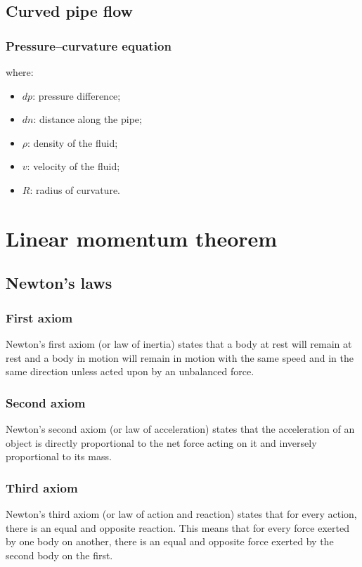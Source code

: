 \documentclass{article}
\begin{document}
\subsection{Curved pipe flow}
\subsubsection{Pressure--curvature equation}

where:
\begin{itemize}
    \item $dp$: pressure difference;
    \item $dn$: distance along the pipe;
    \item $\rho$: density of the fluid;
    \item $v$: velocity of the fluid;
    \item $R$: radius of curvature.
\end{itemize}

\newpage
\section{Linear momentum theorem}
\subsection{Newton's laws}
\subsubsection{First axiom}
Newton's first axiom (or law of inertia) states that a body at rest will remain at rest
and a body in motion will remain in motion with the same speed and in the same direction
unless acted upon by an unbalanced force.


\subsubsection{Second axiom}
Newton's second axiom (or law of acceleration) states that the acceleration of an object
is directly proportional to the net force acting on it and inversely proportional to its mass.

\subsubsection{Third axiom}
Newton's third axiom (or law of action and reaction) states that for every action,
there is an equal and opposite reaction. This means that for every force exerted by one body
on another, there is an equal and opposite force exerted by the second body on the first.
\end{document}
